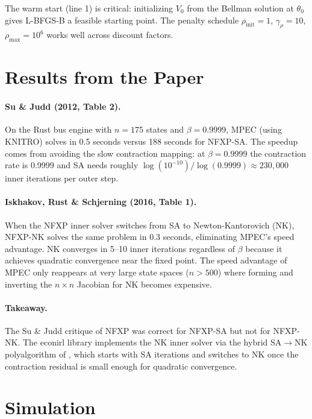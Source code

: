 \documentclass[11pt]{article}
\begin{document}
The warm start (line 1) is critical: initializing $V_0$ from the Bellman solution at $\theta_0$ gives L-BFGS-B a feasible starting point.
The penalty schedule $\rho_{\text{init}} = 1$, $\gamma_\rho = 10$, $\rho_{\max} = 10^6$ works well across discount factors.

\section{Results from the Paper}

\paragraph{Su \& Judd (2012, Table 2).}
On the Rust bus engine with $n = 175$ states and $\beta = 0.9999$, MPEC (using KNITRO) solves in 0.5 seconds versus 188 seconds for NFXP-SA.
The speedup comes from avoiding the slow contraction mapping: at $\beta = 0.9999$ the contraction rate is 0.9999 and SA needs roughly $\log(10^{-10})/\log(0.9999) \approx 230{,}000$ inner iterations per outer step.

\paragraph{Iskhakov, Rust \& Schjerning (2016, Table 1).}
When the NFXP inner solver switches from SA to Newton-Kantorovich (NK), NFXP-NK solves the same problem in 0.3 seconds, eliminating MPEC's speed advantage.
NK converges in 5--10 inner iterations regardless of $\beta$ because it achieves quadratic convergence near the fixed point.
The speed advantage of MPEC only reappears at very large state spaces ($n > 500$) where forming and inverting the $n \times n$ Jacobian for NK becomes expensive.

\paragraph{Takeaway.}
The Su \& Judd critique of NFXP was correct for NFXP-SA but not for NFXP-NK.
The econirl library implements the NK inner solver via the hybrid SA$\to$NK polyalgorithm of \citet{iskhakovRustSchjerning2016}, which starts with SA iterations and switches to NK once the contraction residual is small enough for quadratic convergence.

\section{Simulation}
\end{document}
